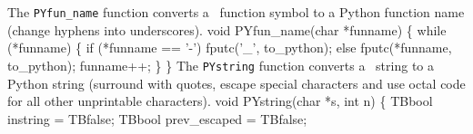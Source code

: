 The \texttt{PYfun\_name} function converts a \TB\ function symbol to a
Python function name (change hyphens into underscores).
\nwenddocs{}\plusendmoddef\nwstartdeflinemarkup{}\nwenddeflinemarkup
void PYfun_name(char *funname) \{
  while (*funname) \{
    if (*funname == '-') fputc('_', to_python);
    else                 fputc(*funname, to_python);
    funname++;
  \}
\}
\nwendcode{}\nwdocspar
The \texttt{PYstring} function converts a \TB\ string to a Python
string (surround with quotes, escape special characters and use
octal code for all other unprintable characters).
\nwenddocs{}\plusendmoddef\nwstartdeflinemarkup{}\nwenddeflinemarkup
void PYstring(char *s, int n) \{
  TBbool instring = TBfalse;
  TBbool prev_escaped = TBfalse;

